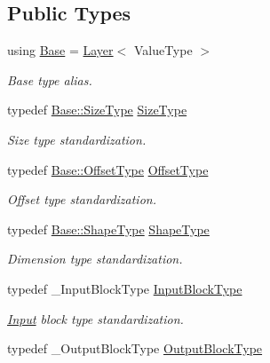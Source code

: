 \subsection*{Public Types}
\begin{DoxyCompactItemize}
\item 
using \hyperlink{classffnn_1_1layer_1_1_hidden_a2ff8a0b925b2b929b05e7889dda361e4}{Base} = \hyperlink{classffnn_1_1layer_1_1_layer}{Layer}$<$ Value\-Type $>$
\begin{DoxyCompactList}\small\item\em Base type alias. \end{DoxyCompactList}\item 
typedef \hyperlink{classffnn_1_1layer_1_1_layer_aeccac281d4220fab9cebf78b004c09d1}{Base\-::\-Size\-Type} \hyperlink{classffnn_1_1layer_1_1_hidden_ac148012cb544a39841675601090cd4c8}{Size\-Type}
\begin{DoxyCompactList}\small\item\em Size type standardization. \end{DoxyCompactList}\item 
typedef \hyperlink{classffnn_1_1layer_1_1_layer_a0e35ffd6e0657856f3a75323b2db9fcb}{Base\-::\-Offset\-Type} \hyperlink{classffnn_1_1layer_1_1_hidden_ae2409b970adafb0ebc9b2eec62c4aac4}{Offset\-Type}
\begin{DoxyCompactList}\small\item\em Offset type standardization. \end{DoxyCompactList}\item 
typedef \hyperlink{classffnn_1_1layer_1_1_layer_ab0b09d33e24cc8ea2b4e236ca4016ab9}{Base\-::\-Shape\-Type} \hyperlink{classffnn_1_1layer_1_1_hidden_abdfcf81b3846fae3b19a207424695df0}{Shape\-Type}
\begin{DoxyCompactList}\small\item\em Dimension type standardization. \end{DoxyCompactList}\item 
typedef \-\_\-\-Input\-Block\-Type \hyperlink{classffnn_1_1layer_1_1_hidden_ae401b1af7763caf09a0dffcaf4f2d5e9}{Input\-Block\-Type}
\begin{DoxyCompactList}\small\item\em \hyperlink{classffnn_1_1layer_1_1_input}{Input} block type standardization. \end{DoxyCompactList}\item 
typedef \-\_\-\-Output\-Block\-Type \hyperlink{classffnn_1_1layer_1_1_hidden_a9b9e276188ef490ea5301f553225c735}{Output\-Block\-Type}

\end{DoxyCompactItemize}
